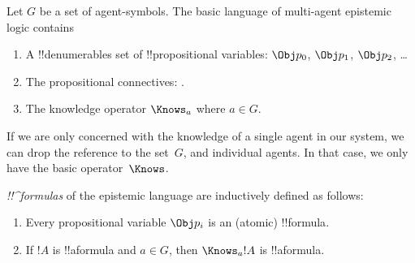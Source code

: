 \documentclass[../../../include/open-logic-section]{subfiles}
\begin{document}


\begin{defn}
Let $G$ be a set of agent-symbols. The basic language of multi-agent
epistemic logic contains
\begin{enumerate}
  \item A !!{denumerable}s set of !!{propositional variable}s: $\Obj
    p_0$, $\Obj p_1$, $\Obj p_2$, \dots
  \item The propositional connectives: \startycommalist
  .
  \item The knowledge operator $\Knows_a$ where $a \in G$.
\end{enumerate}
\end{defn}

If we are only concerned with the knowledge of a single agent in our
system, we can drop the reference to the set~$G$, and individual
agents. In that case, we only have the basic operator~$\Knows$.

\begin{defn}
\emph{!!^{formula}s} of the epistemic language are inductively
  defined as follows:
\begin{enumerate}


\item Every propositional variable $\Obj p_i$ is an (atomic) !!{formula}.






\item If $!A$ is !!a{formula} and $a \in G$, then $\Knows_a !A$ is
  !!a{formula}.

\end{enumerate}
\end{defn}
\end{document}
